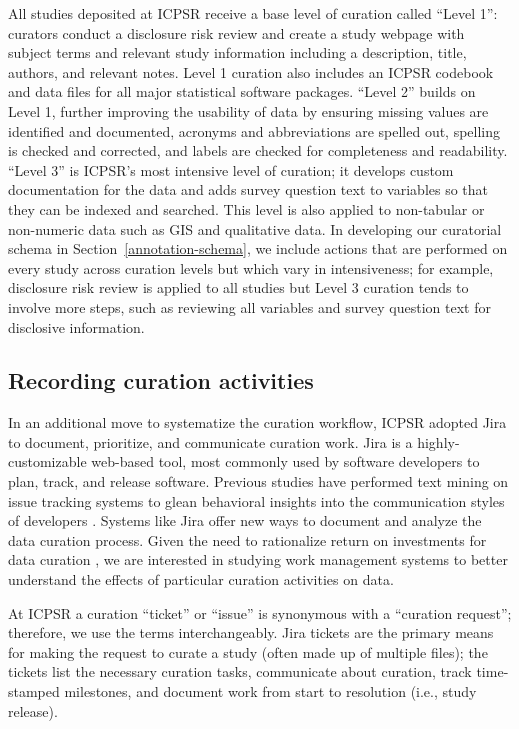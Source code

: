 \documentclass[conference]{IEEEtran}
\begin{document}
All studies deposited at ICPSR receive a base level of curation called “Level 1”: curators conduct a disclosure risk review and create a study webpage with subject terms and relevant study information including a description, title, authors, and relevant notes. Level 1 curation also includes an ICPSR codebook and data files for all major statistical software packages. “Level 2” builds on Level 1, further improving the usability of data by ensuring missing values are identified and documented, acronyms and abbreviations are spelled out, spelling is checked and corrected, and labels are checked for completeness and readability. “Level 3” is ICPSR’s most intensive level of curation; it develops custom documentation for the data and adds survey question text to variables so that they can be indexed and searched. This level is also applied to non-tabular or non-numeric data such as GIS and qualitative data. In developing our curatorial schema in Section~\ref{annotation-schema}, we include actions that are performed on every study across curation levels but which vary in intensiveness; for example, disclosure risk review is applied to all studies but Level 3 curation tends to involve more steps, such as reviewing all variables and survey question text for disclosive information. 

\subsection{Recording curation activities}
\label{recording-curation-activities}
In an additional move to systematize the curation workflow, ICPSR adopted Jira to document, prioritize, and communicate curation work. Jira is a highly-customizable web-based tool, most commonly used by software developers to plan, track, and release software. Previous studies have performed text mining on issue tracking systems to glean behavioral insights into the communication styles of developers \cite{Ortu2015-da}. Systems like Jira offer new ways to document and analyze the data curation process. Given the need to rationalize return on investments for data curation \cite{Parr2019-uz}, we are interested in studying work management systems to better understand the effects of particular curation activities on data.  

At ICPSR a curation “ticket” or “issue” is synonymous with a “curation request”; therefore, we use the terms interchangeably. Jira tickets are the primary means for making the request to curate a study (often made up of multiple files); the tickets list the necessary curation tasks, communicate about curation, track time-stamped milestones, and document work from start to resolution (i.e., study release). 
\end{document}
